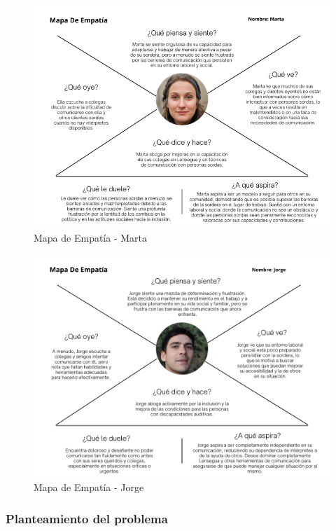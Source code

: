 \begin{figure} [H]
    \centering
    \includegraphics[width=0.9\linewidth]{figuras/mapa_empatia_marta.png}
    \caption{Mapa de Empatía - Marta}
    \label{fig:enter-label}
\end{figure}


\begin{figure} [H]
    \centering
    \includegraphics[width=0.9\linewidth]{figuras/mapa_empatia_jorge_correcto.png}
    \caption{Mapa de Empatía - Jorge}
    \label{fig:enter-label}
\end{figure}

\subsubsection{Planteamiento del problema}

